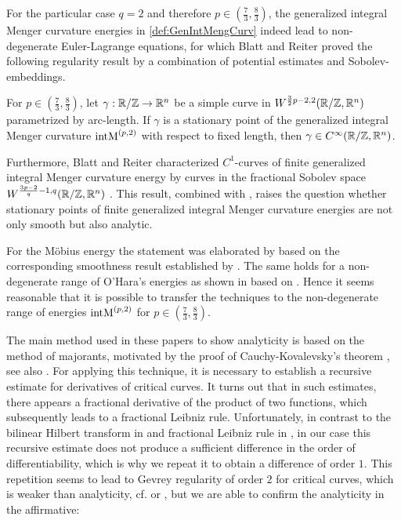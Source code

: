 For  the particular case $q=2$ and therefore $p\in (\tfrac 73, \tfrac 83)$, the generalized integral Menger curvature energies in \eqref{def:GenIntMengCurv} indeed lead to non-degenerate Euler-Lagrange equations, for which Blatt and Reiter proved the following regularity result by a combination of potential estimates and Sobolev-embeddings.


\begin{theorem}\label{thm:smooth}\cite[Theorem~4]{BlattReiter:2015:Menger}
	For $p\in (\tfrac 73, \tfrac 83)$, let $\gamma :\mathbb{R}/\mathbb{Z}\rightarrow \mathbb{R}^n$ be a simple curve in $W^{\frac 32 p -2,2}(\mathbb{R}/\mathbb{Z},\mathbb{R}^n)$ parametrized by arc-length. 
	If $\gamma$ is a stationary point of the generalized integral Menger curvature  $\operatorname{intM}^{\left(p,2\right)}$ 
	with respect to fixed length,
	then $\gamma\in C^\infty(\mathbb{R}/\mathbb{Z},\mathbb{R}^n)$. 
\end{theorem}

Furthermore, Blatt and Reiter characterized $C^1$-curves of finite generalized integral Menger curvature energy by curves in the fractional Sobolev space $W^{\frac {3p-2}{q} -1,q}(\mathbb{R} /\mathbb{Z},\mathbb{R}^n)$ \cite[Theorem~1]{BlattReiter:2015:Menger}.
This result, combined with , raises the question whether stationary points of finite generalized integral Menger curvature energies are not only smooth but also analytic. 

For the Möbius energy the statement was elaborated by \cite{BlattVorderobermeier:2019:CriticalMoebius} based on the corresponding smoothness result established by \cite{BlattReiterSchikorra:2016:CriticalPointsOfMoebiusEnergyAreSmooth}.  The same holds for a non-degenerate range of O'Hara's energies as shown in \cite{Vorderobermeier:2019:CriticalOHara} based on \cite{BlattReiter:2013:StationaryPointsOfOHarasKnotEnergies}. Hence it seems reasonable that it is possible to transfer the techniques to the non-degenerate range of energies $\operatorname{intM}^{\left(p,2\right)}$ for $p\in(\tfrac 73,\tfrac 83)$.


The main method used in these papers to show analyticity is based on the method of majorants, motivated by the proof of Cauchy-Kovalevsky's theorem \cite{Kovalevskaya:1875:ZurTheoriederpartiellenDifferentialgleichungen}, see also \cite[pp.~17--33]{Cauchy:1882:OEuvrescompletesdAugustinCauchy}. For applying this technique, it is necessary to establish a recursive estimate for derivatives of critical curves.
It turns out that in such estimates, there appears 
a fractional derivative of the product of two functions, which subsequently leads to a fractional Leibniz rule. Unfortunately, in contrast to the bilinear Hilbert transform in \cite{BlattVorderobermeier:2019:CriticalMoebius} and fractional Leibniz rule in \cite{Vorderobermeier:2019:CriticalOHara}, in our case this recursive estimate does not produce a sufficient difference in the order of differentiability, which is why we repeat it to obtain a difference of order $1$. 
This repetition seems to lead to Gevrey regularity of order $2$ for critical curves, which is weaker than analyticity, cf. \cite[Definiton 4.1.19]{KrantzParks:2002:Aprimerofrealanalyticfunctions} or \cite[Chapter~1.4]{Rodino:1993:LinearPartialDiffOperatorInGevreySpaces},
but we are able to confirm the analyticity in the affirmative:

